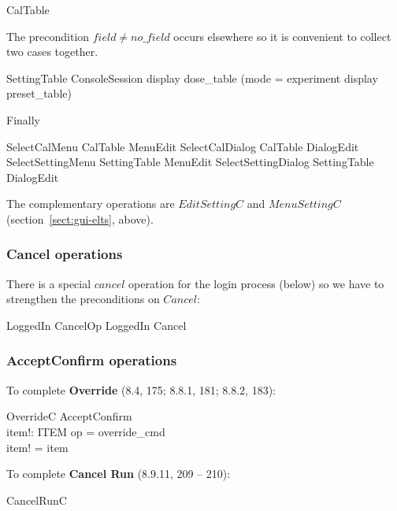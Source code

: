 \begin{zed}
CalTable 
\end{zed}
The precondition $field \neq no\_field$ occurs elsewhere so it is
convenient to collect two cases together.

\begin{schema}{SettingTable}
	ConsoleSession
\where
	display \in dose\_table \lor (mode = experiment \land display \in preset\_table)
\end{schema}
Finally 

\begin{zed}
	SelectCalMenu  CalTable \land MenuEdit
\also
	SelectCalDialog  CalTable \land DialogEdit
\also
	SelectSettingMenu  SettingTable \land MenuEdit
\also
	SelectSettingDialog  SettingTable \land DialogEdit
\end{zed}
The complementary operations are $EditSettingC$ and $MenuSettingC$
(section~\ref{sect:gui-elts}, above).

\subsubsection{Cancel operations}

There is a special $cancel$ operation for the login process (below) so
we have to strengthen the preconditions on $Cancel$:

\begin{zed} 
	LoggedIn 
\also
	CancelOp  LoggedIn \land Cancel
\end{zed}

\subsubsection{AcceptConfirm operations}

To complete {\bf Override} (8.4, 175; 8.8.1, 181; 8.8.2, 183):

\begin{schema}{OverrideC}
	AcceptConfirm \\
	item!: ITEM
\where
	op = override\_cmd \\
	item! = item
\end{schema}
To complete {\bf Cancel Run} (8.9.11, 209 -- 210):

\begin{zed} 
	CancelRunC 
\end{zed}


